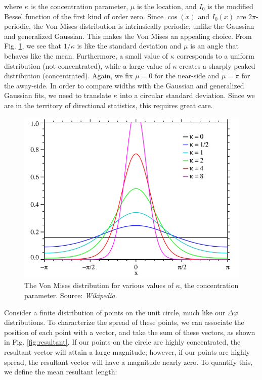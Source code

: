 \documentclass[../main.tex]{subfiles}
\begin{document}
where $\kappa$ is the concentration parameter, $\mu$ is the location, and $I_0$ is the modified Bessel function of the first kind of order zero. Since $\cos{(x)}$ and $I_0(x)$ are $2\pi$-periodic, the Von Mises distribution is intrinsically periodic, unlike the Gaussian and generalized Gaussian. This makes the Von Mises an appealing choice. From Fig. \ref{fig:vonmises}, we see that $1/\kappa$ is like the standard deviation and $\mu$ is an angle that behaves like the mean. Furthermore, a small value of $\kappa$ corresponds to a uniform distribution (not concentrated), while a large value of $\kappa$ creates a sharply peaked distribution (concentrated). Again, we fix $\mu=0$ for the near-side and $\mu=\pi$ for the away-side. In order to compare widths with the Gaussian and generalized Gaussian fits, we need to translate $\kappa$ into a circular standard deviation. Since we are in the territory of directional statistics, this requires great care. 

\begin{figure}
    \centering
    \includegraphics[scale=0.4]{analysis/figs/vonmises.png}
    \caption{The Von Mises distribution for various values of $\kappa$, the concentration parameter. Source: \textit{Wikipedia}.}
    \label{fig:vonmises}
\end{figure}

Consider a finite distribution of points on the unit circle, much like our $\Delta\varphi$ distributions. To characterize the spread of these points, we can associate the position of each point with a vector, and take the sum of these vectors, as shown in Fig. \ref{fig:resultant}. If our points on the circle are highly concentrated, the resultant vector will attain a large magnitude; however, if our points are highly spread, the resultant vector will have a magnitude nearly zero. To quantify this, we define the mean resultant length: 
\end{document}
